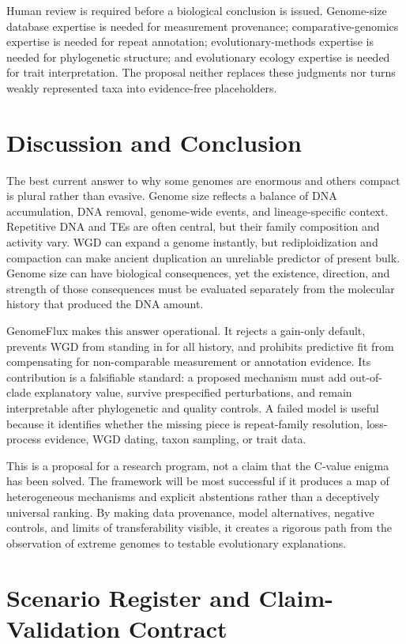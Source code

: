 \documentclass[conference]{IEEEtran}
\newcommand{\gf}{GenomeFlux}
\begin{document}
Human review is required before a biological conclusion is issued. Genome-size database expertise is needed for measurement provenance; comparative-genomics expertise is needed for repeat annotation; evolutionary-methods expertise is needed for phylogenetic structure; and evolutionary ecology expertise is needed for trait interpretation. The proposal neither replaces these judgments nor turns weakly represented taxa into evidence-free placeholders.

\section{Discussion and Conclusion}

The best current answer to why some genomes are enormous and others compact is plural rather than evasive. Genome size reflects a balance of DNA accumulation, DNA removal, genome-wide events, and lineage-specific context. Repetitive DNA and TEs are often central, but their family composition and activity vary. WGD can expand a genome instantly, but rediploidization and compaction can make ancient duplication an unreliable predictor of present bulk. Genome size can have biological consequences, yet the existence, direction, and strength of those consequences must be evaluated separately from the molecular history that produced the DNA amount.

\gf{} makes this answer operational. It rejects a gain-only default, prevents WGD from standing in for all history, and prohibits predictive fit from compensating for non-comparable measurement or annotation evidence. Its contribution is a falsifiable standard: a proposed mechanism must add out-of-clade explanatory value, survive prespecified perturbations, and remain interpretable after phylogenetic and quality controls. A failed model is useful because it identifies whether the missing piece is repeat-family resolution, loss-process evidence, WGD dating, taxon sampling, or trait data.

This is a proposal for a research program, not a claim that the C-value enigma has been solved. The framework will be most successful if it produces a map of heterogeneous mechanisms and explicit abstentions rather than a deceptively universal ranking. By making data provenance, model alternatives, negative controls, and limits of transferability visible, it creates a rigorous path from the observation of extreme genomes to testable evolutionary explanations.

\appendices
\section{Scenario Register and Claim-Validation Contract}
\end{document}
